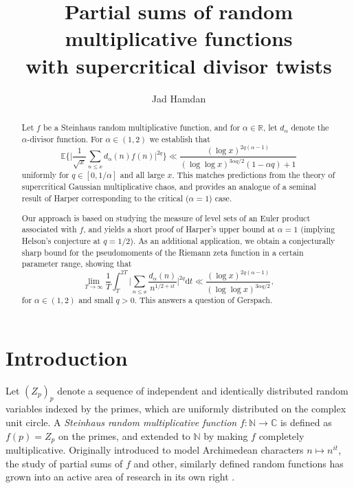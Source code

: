 \documentclass{amsart}
\theoremstyle{definition}
\theoremstyle{remark}
\numberwithin{equation}{section}
\let\origmaketitle\maketitle
\renewcommand{\maketitle}{\vspace*{-45pt}\origmaketitle}
\begin{document}
\title[Random multiplicative functions in the supercritical regime]{Partial sums of random multiplicative functions \\with supercritical divisor twists}


\author{Jad Hamdan}
\address{Mathematical Institute, University of Oxford}

\begin{abstract}
Let $f$ be a Steinhaus random multiplicative function, and for $\alpha\in \mathbb{R}$, let $d_\alpha$ denote the $\alpha$-divisor function. For $\alpha\in(1,2)$ we establish that
\[
\mathbb{E}\bigg\{\Big|\frac{1}{\sqrt{x}}\sum_{n\leq x} d_\alpha(n)f(n)\Big|^{2q}\bigg\}
\ll
\frac{(\log x)^{2q(\alpha-1)}}{(\log\log x)^{3\alpha q/2}(1-\alpha q)+1}
\]
uniformly for $q\in [0,1/\alpha]$ and all large $x$. This matches predictions from the theory of {supercritical} Gaussian multiplicative chaos, and provides an analogue of a seminal result of Harper corresponding to the {critical} ($\alpha=1$) case. 

Our approach is based on studying the measure of level sets of an Euler product associated with $f$, and yields a short proof of Harper’s upper bound at $\alpha=1$ (implying Helson's conjecture at $q=1/2$). As an additional application, we obtain a conjecturally sharp bound for the pseudomoments of the Riemann zeta function in a certain parameter range, showing that 
\[
\lim_{T\to\infty}\frac{1}{T}\int_T^{2T}
\bigg|\sum_{n\leq x}\frac{d_\alpha(n)}{n^{1/2+it}}\bigg|^{2q} \mathrm{d}t
\ll
\frac{(\log x)^{2q(\alpha-1)}}{(\log\log x)^{3\alpha q/2}},
\]
for $\alpha\in (1,2)$ and small $q>0$.
This answers a question of Gerspach.
\end{abstract}


\maketitle

\vspace{-20px}

\section{Introduction}

Let $(Z_p)_p$ denote a sequence of independent and identically distributed random variables indexed by the primes, which are uniformly distributed on the complex unit circle. A \textit{Steinhaus random multiplicative function} $f:\mathbb{N}\to \mathbb{C}$ is defined as $f(p)=Z_p$ on the primes, and extended to $\mathbb{N}$ by making $f$ completely multiplicative. Originally introduced to model Archimedean characters $n\mapsto n^{it}$, the study of partial sums of $f$ and other, similarly defined random functions has grown into an active area of research in its own right \cite{OfirMoDick1,OfirMoDick2,OfirMoDickConvergence,MR4682955,HarperRMF,HarperII}. 
\end{document}
